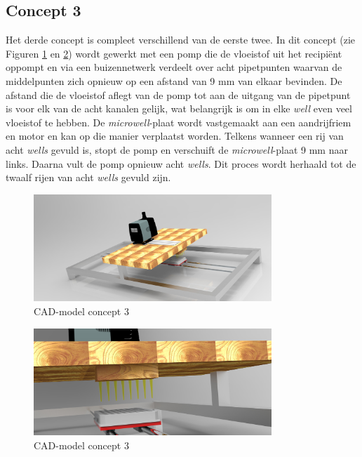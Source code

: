 \documentclass[a4paper,twoside,kulak]{kulakreport} %
\begin{document}
\subsection{Concept 3}
Het derde concept is compleet verschillend van de eerste twee. In dit concept (zie Figuren \ref{fig: CAD-model globaal} en \ref{fig: CAD-model ingezoomd}) wordt gewerkt met een pomp die de vloeistof uit het recipiënt oppompt en via een buizennetwerk verdeelt over acht pipetpunten waarvan de middelpunten zich opnieuw op een afstand van 9 mm van elkaar bevinden. De afstand die de vloeistof aflegt van de pomp tot aan de uitgang van de pipetpunt is voor elk van de acht kanalen gelijk, wat belangrijk is om in elke \textit{well} even veel vloeistof te hebben. De \textit{microwell}-plaat wordt vastgemaakt aan een aandrijfriem en motor en kan op die manier verplaatst worden. Telkens wanneer een rij van acht \textit{wells} gevuld is, stopt de pomp en verschuift de \textit{microwell}-plaat 9 mm naar links. Daarna vult de pomp opnieuw acht \textit{wells}. Dit proces wordt herhaald tot de twaalf rijen van acht \textit{wells} gevuld zijn. 

\begin{figure}[h]
	\centering
	\includegraphics[width=0.8\textwidth]{micdis1.jpg}
	\caption{CAD-model concept 3}
	\label{fig: CAD-model globaal}
	
\end{figure} 

\begin{figure}[h]
	\centering
	\includegraphics[width=0.8\textwidth]{micdis2.jpg}
	\caption{CAD-model concept 3}
	\label{fig: CAD-model ingezoomd}
	
\end{figure} 
\end{document}
